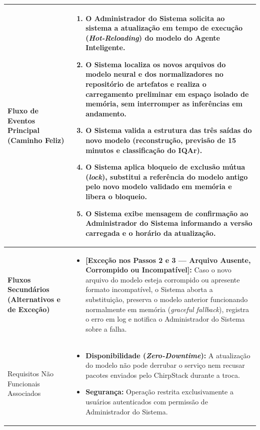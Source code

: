 \documentclass[11pt, a4paper]{article}
\begin{document}
\begin{longtable}{|>{\bfseries}p{3.8cm}|p{12.2cm}|}
Fluxo de Eventos Principal (Caminho Feliz) & 
\begin{enumerate}[nosep, leftmargin=0.5cm]
    \item O Administrador do Sistema solicita ao sistema a atualização em tempo de execução (\emph{Hot-Reloading}) do modelo do Agente Inteligente.
    \item O Sistema localiza os novos arquivos do modelo neural e dos normalizadores no repositório de artefatos e realiza o carregamento preliminar em espaço isolado de memória, sem interromper as inferências em andamento.
    \item O Sistema valida a estrutura das três saídas do novo modelo (reconstrução, previsão de 15 minutos e classificação do IQAr).
    \item O Sistema aplica bloqueio de exclusão mútua (\emph{lock}), substitui a referência do modelo antigo pelo novo modelo validado em memória e libera o bloqueio.
    \item O Sistema exibe mensagem de confirmação ao Administrador do Sistema informando a versão carregada e o horário da atualização.
\end{enumerate} \\ \hline

Fluxos Secundários (Alternativos e de Exceção) & 
\begin{itemize}[nosep, leftmargin=0.5cm]
    \item \textbf{[Exceção nos Passos 2 e 3 --- Arquivo Ausente, Corrompido ou Incompatível]:} Caso o novo arquivo do modelo esteja corrompido ou apresente formato incompatível, o Sistema aborta a substituição, preserva o modelo anterior funcionando normalmente em memória (\emph{graceful fallback}), registra o erro em log e notifica o Administrador do Sistema sobre a falha.
\end{itemize} \\ \hline

Requisitos Não Funcionais Associados & 
\begin{itemize}[nosep, leftmargin=0.5cm]
    \item \textbf{Disponibilidade (\emph{Zero-Downtime}):} A atualização do modelo não pode derrubar o serviço nem recusar pacotes enviados pelo ChirpStack durante a troca.
    \item \textbf{Segurança:} Operação restrita exclusivamente a usuários autenticados com permissão de Administrador do Sistema.
\end{itemize} \\ \hline
\end{longtable}
\end{document}

